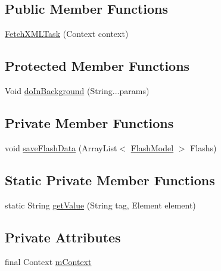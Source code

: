 \subsection*{Public Member Functions}
\begin{DoxyCompactItemize}
\item 
\hyperlink{classorg_1_1buildmlearn_1_1toolkit_1_1flashcardtemplate_1_1data_1_1FetchXMLTask_a1161728f51e11b583fca36f85060e932}{Fetch\+X\+M\+L\+Task} (Context context)
\end{DoxyCompactItemize}
\subsection*{Protected Member Functions}
\begin{DoxyCompactItemize}
\item 
Void \hyperlink{classorg_1_1buildmlearn_1_1toolkit_1_1flashcardtemplate_1_1data_1_1FetchXMLTask_a5433a3f8424fd541246ca58ef7912c14}{do\+In\+Background} (String...\+params)
\end{DoxyCompactItemize}
\subsection*{Private Member Functions}
\begin{DoxyCompactItemize}
\item 
void \hyperlink{classorg_1_1buildmlearn_1_1toolkit_1_1flashcardtemplate_1_1data_1_1FetchXMLTask_a9ac638ca600648d506770beb64c4ef97}{save\+Flash\+Data} (Array\+List$<$ \hyperlink{classorg_1_1buildmlearn_1_1toolkit_1_1flashcardtemplate_1_1data_1_1FlashModel}{Flash\+Model} $>$ Flashs)
\end{DoxyCompactItemize}
\subsection*{Static Private Member Functions}
\begin{DoxyCompactItemize}
\item 
static String \hyperlink{classorg_1_1buildmlearn_1_1toolkit_1_1flashcardtemplate_1_1data_1_1FetchXMLTask_a68b8ae391b85cef3933b78ec136c9382}{get\+Value} (String tag, Element element)
\end{DoxyCompactItemize}
\subsection*{Private Attributes}
\begin{DoxyCompactItemize}
\item 
final Context \hyperlink{classorg_1_1buildmlearn_1_1toolkit_1_1flashcardtemplate_1_1data_1_1FetchXMLTask_a28c8b9d8972cb5118e7a96d2e002f6bc}{m\+Context}
\end{DoxyCompactItemize}


